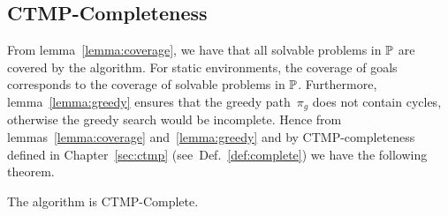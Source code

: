 \documentclass[a4paper]{report}
\begin{document}

\subsection{CTMP-Completeness}
From lemma~\ref{lemma:coverage}, we have that all solvable problems in $\mathbb{P}$ are covered by the algorithm. For static environments, the coverage of goals corresponds to the coverage of solvable problems in $\mathbb{P}$.
%
Furthermore, lemma~\ref{lemma:greedy} ensures that the greedy path~$\pi_g$ does not contain cycles, otherwise the greedy search would be incomplete. Hence from lemmas~\ref{lemma:coverage} and~\ref{lemma:greedy} and by CTMP-completeness defined in Chapter~\ref{sec:ctmp} (see~Def.~\ref{def:complete}) we have the following theorem.

\vspace{2mm}
\begin{theorem}
	The algorithm is CTMP-Complete.
\end{theorem}

%
\end{document}
